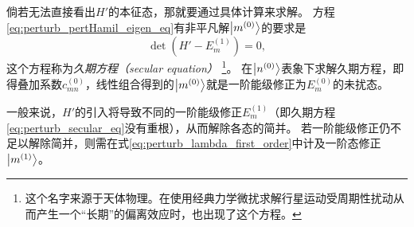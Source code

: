 倘若无法直接看出$H'$的本征态，那就要通过具体计算来求解。
方程\eqref{eq:perturb_pertHamil_eigen_eq}有非平凡解$\ket{m^{(0)}}$的要求是
\begin{equation}
    \label{eq:perturb_secular_eq}
    \det(H'-E_m^{(1)}) = 0,
\end{equation}
这个方程称为\emph{久期方程（secular equation）}
\footnote{这个名字来源于天体物理。在使用经典力学微扰求解行星运动受周期性扰动从而产生一个``长期''的偏离效应时，也出现了这个方程。}。
在$\ket{n^{(0)}}$表象下求解久期方程，即得叠加系数$c_{mn}^{(0)}$，线性组合得到的$\ket{m^{(0)}}$就是一阶能级修正为$E_m^{(0)}$的未扰态。

一般来说，$H'$的引入将导致不同的一阶能级修正$E_m^{(1)}$（即久期方程\eqref{eq:perturb_secular_eq}没有重根），从而解除各态的简并。
若一阶能级修正仍不足以解除简并，则需在式\eqref{eq:perturb_lambda_first_order}中计及一阶态修正$\ket{m^{(1)}}$。


